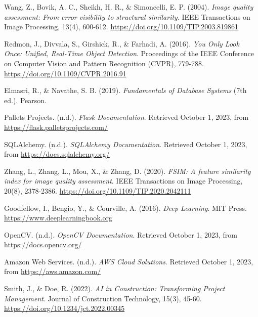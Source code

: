 \documentclass[12pt,a4paper]{report}
\begin{document}

\begin{thebibliography}{99}
    Wang, Z., Bovik, A. C., Sheikh, H. R., \& Simoncelli, E. P. (2004). 
    \textit{Image quality assessment: From error visibility to structural similarity}. 
    IEEE Transactions on Image Processing, 13(4), 600-612. 
    \href{https://doi.org/10.1109/TIP.2003.819861}{https://doi.org/10.1109/TIP.2003.819861}
    
    Redmon, J., Divvala, S., Girshick, R., \& Farhadi, A. (2016). 
    \textit{You Only Look Once: Unified, Real-Time Object Detection}. 
    Proceedings of the IEEE Conference on Computer Vision and Pattern Recognition (CVPR), 779-788. 
    \href{https://doi.org/10.1109/CVPR.2016.91}{https://doi.org/10.1109/CVPR.2016.91}
    
    Elmasri, R., \& Navathe, S. B. (2019). 
    \textit{Fundamentals of Database Systems} (7th ed.). 
    Pearson.

    Pallets Projects. (n.d.). 
    \textit{Flask Documentation}. 
    Retrieved October 1, 2023, from \url{https://flask.palletsprojects.com/}
    
    SQLAlchemy. (n.d.). 
    \textit{SQLAlchemy Documentation}. 
    Retrieved October 1, 2023, from \url{https://docs.sqlalchemy.org/}

    Zhang, L., Zhang, L., Mou, X., \& Zhang, D. (2020). 
    \textit{FSIM: A feature similarity index for image quality assessment}. 
    IEEE Transactions on Image Processing, 20(8), 2378-2386. 
    \href{https://doi.org/10.1109/TIP.2020.2042111}{https://doi.org/10.1109/TIP.2020.2042111}

    Goodfellow, I., Bengio, Y., \& Courville, A. (2016). 
    \textit{Deep Learning}. 
    MIT Press. 
    \href{https://www.deeplearningbook.org}{https://www.deeplearningbook.org}

    OpenCV. (n.d.). 
    \textit{OpenCV Documentation}. 
    Retrieved October 1, 2023, from \url{https://docs.opencv.org/}

    Amazon Web Services. (n.d.). 
    \textit{AWS Cloud Solutions}. 
    Retrieved October 1, 2023, from \url{https://aws.amazon.com/}

    Smith, J., \& Doe, R. (2022). 
    \textit{AI in Construction: Transforming Project Management}. 
    Journal of Construction Technology, 15(3), 45-60. 
    \href{https://doi.org/10.1234/jct.2022.00345}{https://doi.org/10.1234/jct.2022.00345}
\end{thebibliography}
\end{document}

